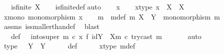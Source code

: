 \begin{isabellebody}
\ \ \ {\isachardoublequoteopen}is{\isacharunderscore}{\kern0pt}finite\ X{\isachardoublequoteclose}\isanewline
%
\isadelimproof
\ \ %
\endisadelimproof
%
\isatagproof
{}\isamarkupfalse%
\ is{\isacharunderscore}{\kern0pt}finite{\isacharunderscore}{\kern0pt}def\isanewline
{}\isamarkupfalse%
{\isacharparenleft}{\kern0pt}auto{\isacharparenright}{\kern0pt}\isanewline
\ \ \isamarkupfalse%
\ x\isanewline
\ \ \isamarkupfalse%
\ x{\isacharunderscore}{\kern0pt}type{\isacharcolon}{\kern0pt}\ {\isachardoublequoteopen}x\ {\isacharcolon}{\kern0pt}\ X\ {\isasymrightarrow}\ X{\isachardoublequoteclose}\isanewline
\ \ \isamarkupfalse%
\ x{\isacharunderscore}{\kern0pt}mono{\isacharcolon}{\kern0pt}\ {\isachardoublequoteopen}monomorphism\ x{\isachardoublequoteclose}\isanewline
\isanewline
\ \ \isamarkupfalse%
\ m\ \ m{\isacharunderscore}{\kern0pt}def{\isacharcolon}{\kern0pt}\ {\isachardoublequoteopen}m{\isacharcolon}{\kern0pt}\ X\ {\isasymrightarrow}\ Y\ {\isasymand}\ monomorphism\ m{\isachardoublequoteclose}\isanewline
\ \ \ \ \isamarkupfalse%
\ assms{\isacharparenleft}{\kern0pt}{}{\isacharparenright}{\kern0pt}\ is{\isacharunderscore}{\kern0pt}smaller{\isacharunderscore}{\kern0pt}than{\isacharunderscore}{\kern0pt}def\ \isamarkupfalse%
\ blast\isanewline
\ \ \isamarkupfalse%
\ {\isasymphi}\ \ {\isasymphi}{\isacharunderscore}{\kern0pt}def{\isacharcolon}{\kern0pt}\ {\isachardoublequoteopen}{\isasymphi}\ {\isacharequal}{\kern0pt}\ into{\isacharunderscore}{\kern0pt}super\ m\ {\isasymcirc}\isactrlsub c\ {\isacharparenleft}{\kern0pt}x\ {\isasymbowtie}\isactrlsub f\ id{\isacharparenleft}{\kern0pt}Y\ {\isasymsetminus}\ {\isacharparenleft}{\kern0pt}X{\isacharcomma}{\kern0pt}m{\isacharparenright}{\kern0pt}{\isacharparenright}{\kern0pt}{\isacharparenright}{\kern0pt}\ {\isasymcirc}\isactrlsub c\ try{\isacharunderscore}{\kern0pt}cast\ m{\isachardoublequoteclose}\ \isanewline
\ \ \ \ \isamarkupfalse%
\ auto\isanewline
\isanewline
\ \ \isamarkupfalse%
\ {\isasymphi}{\isacharunderscore}{\kern0pt}type{\isacharcolon}{\kern0pt}\ {\isachardoublequoteopen}{\isasymphi}\ {\isacharcolon}{\kern0pt}\ Y\ {\isasymrightarrow}\ Y{\isachardoublequoteclose}\isanewline
\ \ \ \ \isamarkupfalse%
\ {\isasymphi}{\isacharunderscore}{\kern0pt}def\isanewline
\ \ \ \ \isamarkupfalse%
\ x{\isacharunderscore}{\kern0pt}type\ m{\isacharunderscore}{\kern0pt}def\ \isamarkupfalse%

\end{isabellebody}
